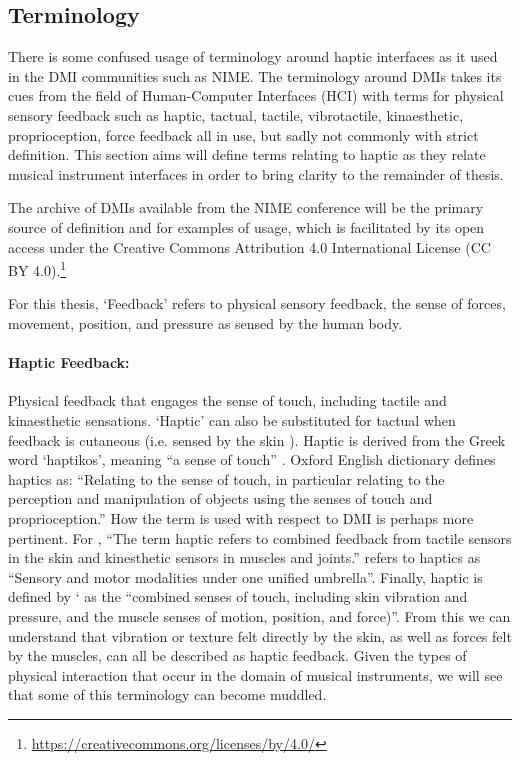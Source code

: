 \subsection{Terminology}

There is some confused usage of  terminology around haptic interfaces as it used
in the DMI communities such as NIME. The terminology around DMIs takes its cues
from the field of Human-Computer Interfaces (HCI) with terms for physical
sensory feedback such as haptic, tactual, tactile, vibrotactile, kinaesthetic,
proprioception, force feedback all in use, but sadly not commonly with strict
definition. This section aims will define terms relating to haptic as they
relate musical instrument interfaces in order to bring clarity to the remainder
of thesis. 

The archive of DMIs available from the NIME conference will be the primary
source of definition and for examples of usage, which is facilitated by its open
access under the Creative Commons Attribution 4.0 International License (CC BY
4.0).\footnote{\url{https://creativecommons.org/licenses/by/4.0/}}

For this thesis, `Feedback' refers to physical sensory feedback, the sense of
forces, movement, position, and pressure as sensed by the human body. 


\paragraph{Haptic Feedback:} Physical feedback that engages the sense of touch, including
tactile and kinaesthetic sensations. `Haptic' can also be substituted for tactual
when feedback is cutaneous (i.e. sensed by the skin \cite{bongers_tactual_1998, srinivasan_tactual_1996}). 
Haptic is derived from the Greek word `haptikos', meaning ``a sense of touch'' \cite{culmer_haptics_2020}. 
Oxford English dictionary defines haptics as: ``Relating to the sense of touch, in particular
relating to the perception and manipulation of objects using the senses of touch
and proprioception.''
How the term is used with respect to DMI is perhaps more pertinent.
For \textcite{omodhrain_playing_2000}, ``The term haptic refers to combined feedback from tactile sensors in the skin and kinesthetic sensors in muscles and joints.''  
\textcite{rovan_typology_2000} refers to haptics as ``Sensory and motor modalities under one unified umbrella''. Finally, haptic is defined by \textcite{cook_remutualizing_2004}` as the ``combined senses of touch, including skin vibration and pressure, and the muscle senses of motion,
position, and force)''.
From this we can understand that vibration or texture felt directly by the skin, as well as forces felt by the muscles, can all be described as haptic feedback. Given the types of physical interaction that occur in the domain of musical instruments, we will see that some of this terminology can become muddled.

